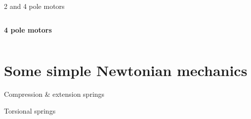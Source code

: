 \documentclass[compress]{beamer}
\begin{document}
\begin{frame}{2 and 4 pole motors}
\begin{columns}
\begin{column}{0.5\linewidth}
\begin{center}
                \textbf{4 pole motors}
            \end{center}
        \end{column}
    \end{columns}


\end{frame}

\section{Some simple Newtonian mechanics}

{
    \begin{frame}{Compression \& extension springs}

%
%
%
%
%

\end{frame}
}


{
\begin{frame}{Torsional springs}
%
%
%
%
\end{frame}
}
\end{document}
